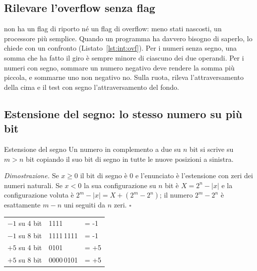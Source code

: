 \subsection{Rilevare l'overflow senza flag}

\riscv non ha un flag di riporto né un flag di overflow: meno stati nascosti,
un processore più semplice. Quando un programma ha davvero bisogno di saperlo,
lo chiede con un confronto (Listato~\ref{lst:int:ovf}). Per i numeri senza
segno, una somma che ha fatto il giro è sempre minore di ciascuno dei due
operandi. Per i numeri con segno, sommare un numero negativo deve rendere la
somma più piccola, e sommarne uno non negativo no. Sulla ruota, 
rileva l'attraversamento della cima e il test con segno l'attraversamento del
fondo.


\subsection{Estensione del segno: lo stesso numero su più bit}

\begin{theorem}{Estensione del segno}
Un numero in complemento a due su $n$ bit si scrive su $m>n$ bit copiando il
suo bit di segno in tutte le nuove posizioni a sinistra.
\end{theorem}

\noindent\emph{Dimostrazione.} Se $x\ge 0$ il bit di segno è 0 e l'enunciato è
l'estensione con zeri dei numeri naturali. Se $x<0$ la sua configurazione su
$n$ bit è $X=2^{n}-|x|$ e la configurazione voluta è
$2^{m}-|x| = X + (2^{m}-2^{n})$; il numero $2^{m}-2^{n}$ è esattamente $m-n$
uni seguiti da $n$ zeri.
\hfill$\square$

\begin{center}\ttfamily
\begin{tabular}{@{}r@{\quad}l@{\quad}l@{}}
\textsf{$-1$ su 4 bit} & \phantom{1111\,}1111 & = -1\\
\textsf{$-1$ su 8 bit} & \textcolor{prgred}{1111}\,1111 & = -1\\
\textsf{$+5$ su 4 bit} & \phantom{0000\,}0101 & = +5\\
\textsf{$+5$ su 8 bit} & \textcolor{prgsteel}{0000}\,0101 & = +5\\
\end{tabular}
\end{center}

